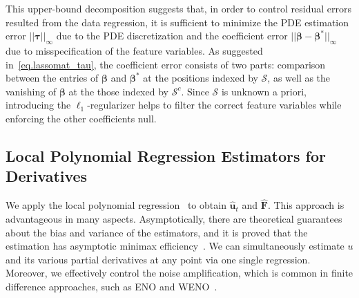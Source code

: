 \documentclass[a4paper,11pt]{article}
\newcommand{\btau}{\bm{\tau}}
\newcommand{\bbeta}{\bm{\beta}}
\newcommand{\bF}{\mathbf{F}}
\newcommand{\mS}{\mathcal{S}}
\newcommand{\bu}{\mathbf{u}}
\begin{document}
This upper-bound decomposition suggests that, in order to control residual errors resulted from the data regression, it is sufficient to minimize the PDE estimation error $||\btau||_\infty$ due to the PDE discretization and the coefficient error $||\bbeta-\bbeta^*||_\infty$ due to misspecification of the feature variables. As suggested in~\eqref{eq.lassomat_tau}, the coefficient error consists of two parts: comparison between the entries of $\bbeta$ and $\bbeta^*$ at the positions indexed by $\mS$, as well as the vanishing of $\bbeta$ at the those indexed by $\mS^c$. Since $\mS$ is unknown a priori, introducing the $\ell_1$-regularizer helps to filter  the correct feature variables while enforcing the other coefficients null.


\subsection{Local Polynomial Regression Estimators for Derivatives}


We apply the local polynomial regression~\cite{fan1997local} to obtain $\widehat{\bu}_t$ and $\widehat{\bF}$. This approach is advantageous in many aspects. Asymptotically, there are theoretical guarantees about the bias and variance of the estimators, and it is proved that the estimation has asymptotic minimax efficiency~\cite{fan1997local}. We can simultaneously estimate $u$ and its various partial derivatives at any point via one single regression. Moreover, we effectively control the noise amplification, which is common in finite difference approaches, such as ENO and WENO~\cite{shu1999high}.
\end{document}

